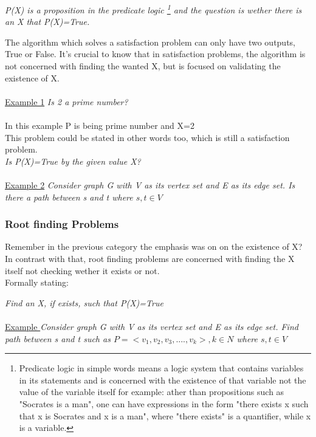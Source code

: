 \documentclass[twocolumn,a4paper, 10pt]{article}
\begin{document}
                \emph{P(X) is a proposition in the predicate logic \footnote{Predicate logic in simple words means a logic system that
                contains variables in its statements and is concerned with the existence of that variable not the value of the variable itself 
                for example: ather than propositions such as "Socrates is a man", one can have expressions in the form "there exists x such that x is Socrates and x is a man", where "there exists" 
                is a quantifier, while x is a variable.} and the question is wether there is an X that P(X)=True. } 


                The algorithm which solves a satisfaction problem can only have two outputs, True or False.
                It's crucial to know that in satisfaction problems, the algorithm is not concerned with 
                finding the wanted X, but is focused on validating the existence of X. \\ \\ 
                \underline{Example 1}
                    \emph{Is 2 a prime number?} \\ \\ 
                        In this example P is being prime number and X=2 \\ 
                        This problem could be stated in other words too, which is still a satisfaction problem. \\ 
                        \emph{Is P(X)=True by the given value X?} \\ \\
                \underline{Example 2}
                    \emph{Consider graph G with V as its vertex set and E as its edge set. Is there a path between s and t where \begin{math}
                    s,t \in V \end{math}}
            \subsubsection{Root finding Problems}
                    Remember in the previous category the emphasis was on on the existence of X? \\ 
                    In contrast with that, root finding problems are concerned with finding the X itself not checking wether it exists or not. \\ 
                    Formally stating: 

                    
                    \emph{Find an X, if exists, such that P(X)=True} \\ \\ 
                    \underline{Example }
                        \emph{Consider graph G with V as its vertex set and E as its edge set. Find path between s and t such as 
                        \begin{math}
                        P=<v_1, v_2, v_3, ...., v_k>, k\in N \end{math} where \begin{math}
                        s,t \in V \end{math}}
\end{document}
